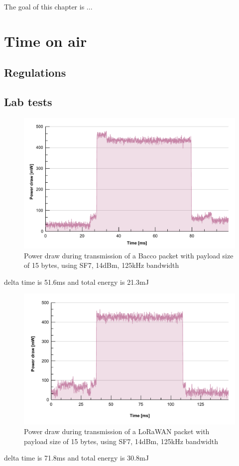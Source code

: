 
The goal of this chapter is ...

\section{Time on air}

\subsection{Regulations}

\subsection{Lab tests}

\begin{figure}[ht]
    \centering
    \includegraphics[width=1.0\textwidth]{images/bacco_SF7_14dbm_125khz_power.pdf}
    \caption{Power draw during transmission of a Bacco packet with payload size of 15 bytes, using SF7, 14dBm, 125kHz bandwidth}
    \label{bacco SF7}
\end{figure}
delta time is 51.6ms and total energy is 21.3mJ

\begin{figure}[ht]
    \centering
    \includegraphics[width=1.0\textwidth]{images/lorawan_SF7_14dbm_125khz_power.pdf}
    \caption{Power draw during transmission of a LoRaWAN packet with payload size of 15 bytes, using SF7, 14dBm, 125kHz bandwidth}
    \label{LoRaWAN SF7}
\end{figure}
delta time is 71.8ms and total energy is 30.8mJ
